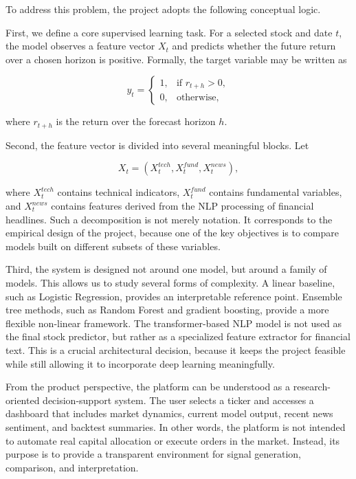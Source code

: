 \documentclass[12pt,a4paper]{article}
\begin{document}
To address this problem, the project adopts the following conceptual logic.

First, we define a core supervised learning task. For a selected stock and date $t$, the model observes a feature vector $X_t$ and predicts whether the future return over a chosen horizon is positive. Formally, the target variable may be written as

\[
y_t =
\begin{cases}
1, & \text{if } r_{t+h} > 0, \\
0, & \text{otherwise,}
\end{cases}
\]

where $r_{t+h}$ is the return over the forecast horizon $h$.

Second, the feature vector is divided into several meaningful blocks. Let

\[
X_t = \left(X_t^{tech}, X_t^{fund}, X_t^{news}\right),
\]

where $X_t^{tech}$ contains technical indicators, $X_t^{fund}$ contains fundamental variables, and $X_t^{news}$ contains features derived from the NLP processing of financial headlines. Such a decomposition is not merely notation. It corresponds to the empirical design of the project, because one of the key objectives is to compare models built on different subsets of these variables.

Third, the system is designed not around one model, but around a family of models. This allows us to study several forms of complexity. A linear baseline, such as Logistic Regression, provides an interpretable reference point. Ensemble tree methods, such as Random Forest and gradient boosting, provide a more flexible non-linear framework. The transformer-based NLP model is not used as the final stock predictor, but rather as a specialized feature extractor for financial text. This is a crucial architectural decision, because it keeps the project feasible while still allowing it to incorporate deep learning meaningfully.

From the product perspective, the platform can be understood as a research-oriented decision-support system. The user selects a ticker and accesses a dashboard that includes market dynamics, current model output, recent news sentiment, and backtest summaries. In other words, the platform is not intended to automate real capital allocation or execute orders in the market. Instead, its purpose is to provide a transparent environment for signal generation, comparison, and interpretation.
\end{document}
